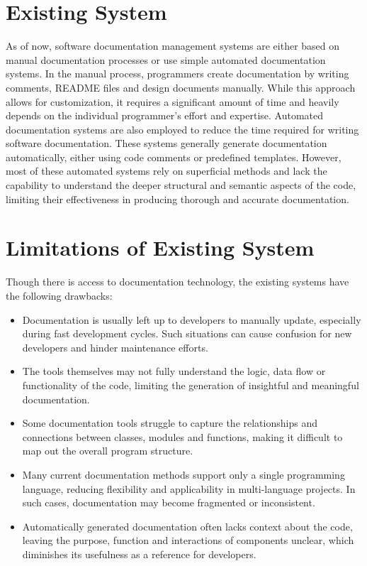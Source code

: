 \section{Existing System}
\hspace{0.5cm}
As of now, software documentation management systems are either based on manual documentation processes or use simple automated documentation systems. In the manual process, programmers create documentation by writing comments, README files and design documents manually. While this approach allows for customization, it requires a significant amount of time and heavily depends on the individual programmer’s effort and expertise. Automated documentation systems are also employed to reduce the time required for writing software documentation. These systems generally generate documentation automatically, either using code comments or predefined templates. However, most of these automated systems rely on superficial methods and lack the capability to understand the deeper structural and semantic aspects of the code, limiting their effectiveness in producing thorough and accurate documentation.


\section{Limitations of Existing System}
\hspace{0.5cm}
Though there is access to documentation technology, the existing systems have the following drawbacks:

\begin{itemize}
\item Documentation is usually left up to developers to manually update, especially during fast development cycles. Such situations can cause confusion for new developers and hinder maintenance efforts.
\item The tools themselves may not fully understand the logic, data flow or functionality of the code, limiting the generation of insightful and meaningful documentation.
\item Some documentation tools struggle to capture the relationships and connections between classes, modules and functions, making it difficult to map out the overall program structure.
\item Many current documentation methods support only a single programming language, reducing flexibility and applicability in multi-language projects. In such cases, documentation may become fragmented or inconsistent.
\item Automatically generated documentation often lacks context about the code, leaving the purpose, function and interactions of components unclear, which diminishes its usefulness as a reference for developers.
\end{itemize}

